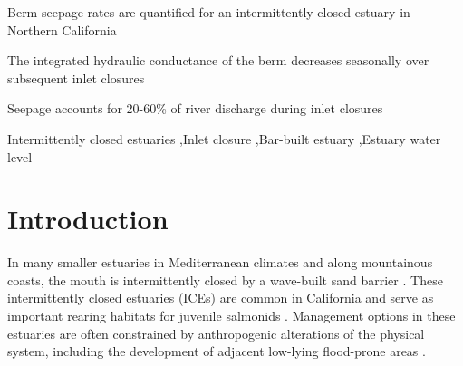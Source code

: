 \documentclass[preprint,12pt,authoryear]{elsarticle}
\begin{document}
\begin{frontmatter}
\begin{highlights}
\item Berm seepage rates are quantified for an  intermittently-closed estuary in Northern California
\item The integrated hydraulic conductance of the berm decreases seasonally over subsequent inlet closures
\item Seepage accounts for 20-60\% of river discharge during inlet closures
\end{highlights}

\begin{keyword}
Intermittently closed estuaries \sep  Inlet closure \sep  Bar-built estuary \sep  Estuary water level
\end{keyword}

\end{frontmatter}


%  

\section{Introduction}
\label{sec:intro}

In many smaller estuaries in Mediterranean climates and along mountainous coasts, the mouth is intermittently closed by a wave-built sand barrier \citep{mcsweeney2017intermittently, largier2023recognizing}. 
These intermittently closed estuaries (ICEs) are common in California 
\citep{heady2015assessing} and serve as important rearing habitats for juvenile salmonids \citep{bond2008marine, heady2015assessing, huber2020environmental}. Management options in these estuaries are often constrained by anthropogenic alterations of the physical system, including the development of adjacent low-lying flood-prone areas \citep{largier2019considerations}.
\end{document}
